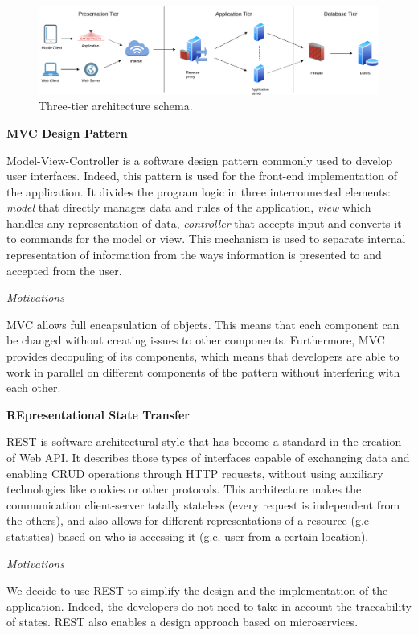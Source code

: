 \documentclass{report}
\begin{document}
\begin{figure}[!ht]
	\begin{center}
	\includegraphics[width=\textwidth]{img/TiersArchitecture.png}
	\end{center}
	\caption{Three-tier architecture schema.}
\end{figure}

\begin{center}\large{\textbf{MVC Design Pattern}}\end{center}
Model-View-Controller is a software design pattern commonly used to develop user interfaces. Indeed, this pattern is used for the front-end implementation of the application. It divides the program logic in three interconnected elements: \textit{model} that directly manages data and rules of the application, \textit{view} which handles any representation of data, \textit{controller} that 
accepts input and converts it to commands for the model or view. This mechanism is used to separate internal representation of information from the ways information is presented to and accepted from the user. 
\begin{center}\large{\textit{Motivations}}\end{center} 
MVC allows full encapsulation of objects. This means that each component can be changed without creating issues to other components.
Furthermore, MVC provides decopuling of its components, which means that developers are able to work in parallel on different components of the pattern without interfering with each other.

\vspace{2mm}
\begin{center}\large{\textbf{REpresentational State Transfer}}\end{center}
REST is software architectural style that has become a standard in the creation of Web API. It describes those types of interfaces capable of exchanging data and enabling CRUD operations through HTTP requests, without using auxiliary technologies like cookies or other protocols. This architecture makes the communication client-server totally stateless (every request is independent from the others), and also allows for different representations of a resource (g.e statistics) based on who is accessing it (g.e. user from a certain location).
\begin{center}\large{\textit{Motivations}}\end{center}
We decide to use REST to simplify the design and the implementation of the application. Indeed, the developers do not need to take in account the traceability of states. REST also enables a design approach based on microservices.
\end{document}

